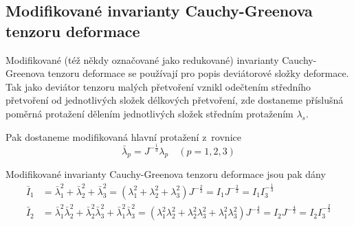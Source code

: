 
\subsection{Modifikované invarianty Cauchy-Greenova tenzoru deformace}
Modifikované (též někdy označované jako redukované) invarianty Cauchy-Greenova tenzoru deformace se používají pro popis deviátorové složky deformace. Tak jako deviátor tenzoru malých přetvoření vznikl odečtením středního přetvoření od jednotlivých složek délkových přetvoření, zde dostaneme příslušná poměrná protažení dělením jednotlivých složek středním protažením $\lambda_s$. 

Pak dostaneme modifikovaná hlavní protažení z~rovnice
\begin{equation}
	\bar{\lambda}_p = J^{-\frac{1}{3}} \lambda_p \quad (p = 1,2,3)
\end{equation}

Modifikované invarianty Cauchy-Greenova tenzoru deformace jsou pak dány 
\begin{align}
	\bar{I}_1
	&= \bar{\lambda}_1^2 + \bar{\lambda}_2^2 + \bar{\lambda}_3^2
	= \left(\lambda_1^2 + \lambda_2^2 + \lambda_3^2\right) J^{-\frac{2}{3}}
	= I_1 J^{-\frac{2}{3}}
	= I_1 I_3^{-\frac{1}{3}}\\
	\bar{I}_2
	&= \bar{\lambda}_1^2 \bar{\lambda}_2^2 + \bar{\lambda}_2^2 \bar{\lambda}_3^2 + \bar{\lambda}_1^2 \bar{\lambda}_3^2
	= \left(\lambda_1^2 \lambda_2^2 + \lambda_2^2 \lambda_3^2 + \lambda_1^2 \lambda_3^2\right) J^{-\frac{4}{3}}
	= I_2 J^{-\frac{4}{3}}
	= I_2 I_3^{-\frac{2}{3}}
\end{align}
